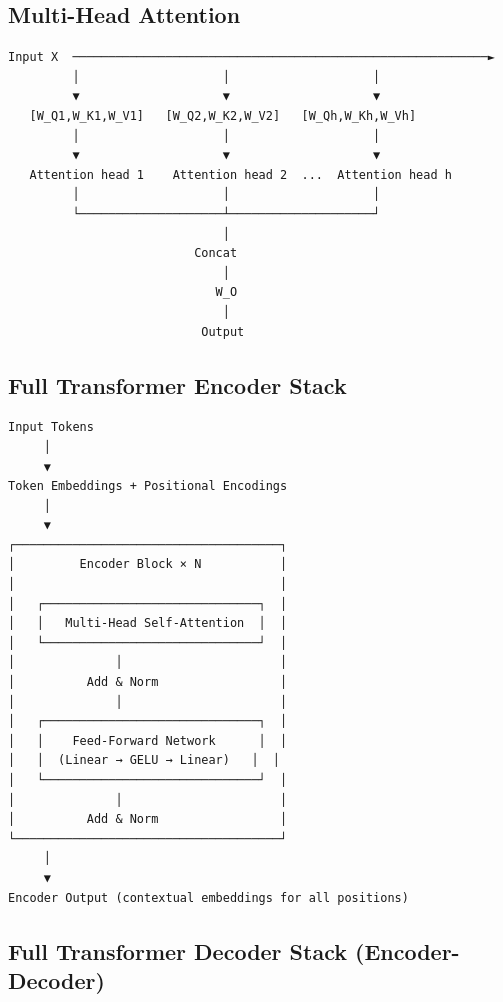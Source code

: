 \documentclass[11pt]{article}
\begin{document}
\subsection{Multi-Head Attention}\label{multi-head-attention-1}

\setcodelang{}

\begin{verbatim}
Input X  ──────────────────────────────────────────────────────────►
         │                    │                    │
         ▼                    ▼                    ▼
   [W_Q1,W_K1,W_V1]   [W_Q2,W_K2,W_V2]   [W_Qh,W_Kh,W_Vh]
         │                    │                    │
         ▼                    ▼                    ▼
   Attention head 1    Attention head 2  ...  Attention head h
         │                    │                    │
         └────────────────────┴────────────────────┘
                              │
                          Concat
                              │
                             W_O
                              │
                           Output
\end{verbatim}

\subsection{Full Transformer Encoder Stack}\label{full-transformer-encoder-stack}

\setcodelang{}

\begin{verbatim}
Input Tokens
     │
     ▼
Token Embeddings + Positional Encodings
     │
     ▼
┌─────────────────────────────────────┐
│         Encoder Block × N           │
│                                     │
│   ┌──────────────────────────────┐  │
│   │   Multi-Head Self-Attention  │  │
│   └──────────────────────────────┘  │
│              │                      │
│          Add & Norm                 │
│              │                      │
│   ┌──────────────────────────────┐  │
│   │    Feed-Forward Network      │  │
│   │  (Linear → GELU → Linear)   │  │
│   └──────────────────────────────┘  │
│              │                      │
│          Add & Norm                 │
└─────────────────────────────────────┘
     │
     ▼
Encoder Output (contextual embeddings for all positions)
\end{verbatim}

\subsection{Full Transformer Decoder Stack (Encoder-Decoder)}\label{full-transformer-decoder-stack-encoder-decoder}
\end{document}
